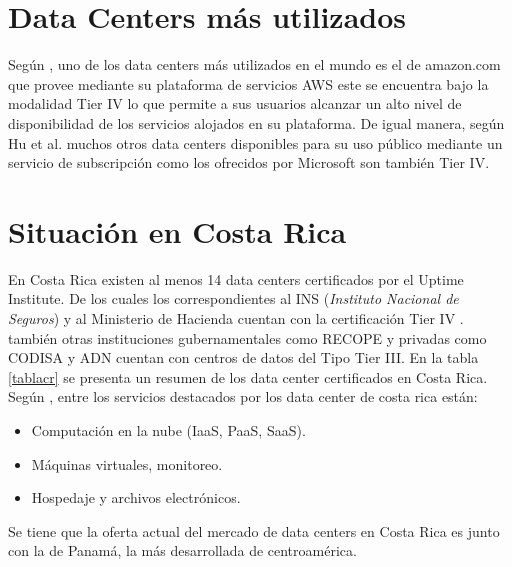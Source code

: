 \documentclass[journal]{IEEEtran}
\begin{document}
\section{Data Centers más utilizados}
Según \cite{amazon_2003}, uno de los data centers más utilizados en el mundo es el de amazon.com que provee mediante su plataforma de servicios AWS este se encuentra bajo la modalidad Tier IV
lo que permite a sus usuarios alcanzar un alto nivel de disponibilidad de los servicios alojados en su plataforma.
De igual manera, según Hu et al.\cite{zhengbing_gnatyuk_koval_gnatyuk_bondarovets_2017} muchos otros data centers disponibles para su uso público mediante un servicio de subscripción como los ofrecidos por Microsoft son también Tier IV.
\section{Situación en Costa Rica}
En Costa Rica existen al menos 14 data centers certificados por el Uptime Institute. De los cuales los correspondientes al INS (\emph{Instituto Nacional de Seguros}) y al Ministerio de Hacienda cuentan con la certificación Tier IV \cite{castro}.
también otras instituciones gubernamentales como RECOPE y privadas como CODISA y ADN cuentan con centros de datos del Tipo Tier III. En la tabla \ref{tablacr} se presenta un resumen de los data center certificados en Costa Rica.
Según \cite{perez_2019}, entre los servicios destacados por los data center de costa rica están:
\begin{itemize}
  \item Computación en la nube (IaaS, PaaS, SaaS).
  \item Máquinas virtuales, monitoreo.
  \item Hospedaje y archivos electrónicos.
\end{itemize}
Se tiene que la oferta actual del mercado de data centers en Costa Rica es junto con la de Panamá, la más desarrollada de centroamérica.
\end{document}
